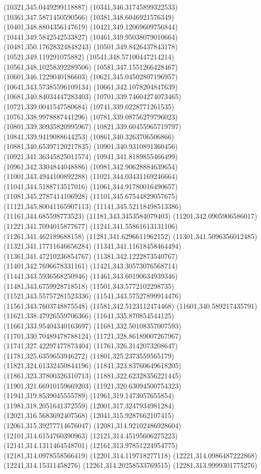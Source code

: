 {(10321,345.0449299118887)
(10341,346.31745899322533)
(10361,347.5871450590566)
(10381,348.6046921576349)
(10401,348.8804356147619)
(10421,349.12069609756844)
(10441,349.5842542533827)
(10461,349.95038079010664)
(10481,350.17628324848243)
(10501,349.8426437843178)
(10521,349.119291075882)
(10541,348.57100447214214)
(10561,348.10258392289506)
(10581,347.1551266428467)
(10601,346.1229040186603)
(10621,345.04502807196957)
(10641,343.57385596109134)
(10661,342.1078204847639)
(10681,340.84034447283403)
(10701,339.74604274073465)
(10721,339.0041547580684)
(10741,339.0228771261535)
(10761,338.9978887441296)
(10781,339.08756279796023)
(10801,339.30935820995967)
(10821,339.60455965719797)
(10841,339.9419088644253)
(10861,340.3263706506866)
(10881,340.65397120217835)
(10901,340.9310891360456)
(10921,341.36345825011574)
(10941,341.8189855466499)
(10961,342.3304844048886)
(10981,342.90628884639654)
(11001,343.4944100892288)
(11021,344.03431169246664)
(11041,344.5188713517016)
(11061,344.91780016490657)
(11081,345.2787414106928)
(11101,345.67544829057675)
(11121,345.80041165907113)
(11141,345.52118498513386)
(11161,344.685598773523)
(11181,343.3453584079403)
(11201,342.0905906586017)
(11221,341.7094015877677)
(11241,341.55861613131106)
(11261,341.462189688158)
(11281,341.6296611962152)
(11301,341.5096356012485)
(11321,341.17711646656284)
(11341,341.11618458464494)
(11361,341.47210236854767)
(11381,342.1222873540767)
(11401,342.7696678331161)
(11421,343.30573076568714)
(11441,343.5936568250946)
(11461,343.60190634939346)
(11481,343.6759928718518)
(11501,343.5772102298735)
(11521,343.55757281523336)
(11541,343.57527899914476)
(11561,343.7603748875548)
(11581,342.5123112474468)
(11601,340.589217435791)
(11621,338.47926559706366)
(11641,335.870854544125)
(11661,333.95404340163697)
(11681,332.50108357007593)
(11701,330.70489478788124)
(11721,328.86189007267967)
(11741,327.42297477873404)
(11761,326.3142073208647)
(11781,325.6359653946272)
(11801,325.2373559565179)
(11821,324.61332450844196)
(11841,323.83760649618205)
(11861,323.37800326310713)
(11881,322.62328356221445)
(11901,321.66910159669203)
(11921,320.63094500754323)
(11941,319.8539045555789)
(11961,319.1473057655854)
(11981,318.2051641372559)
(12001,317.3247934981284)
(12021,316.5683692407568)
(12041,315.9287662107415)
(12061,315.39277714676047)
(12081,314.92102486928604)
(12101,314.6154760390963)
(12121,314.45195606275223)
(12141,314.1311464548701)
(12161,313.97851224954775)
(12181,314.0978558566419)
(12201,314.119718277118)
(12221,314.0986487222868)
(12241,314.15311458276)
(12261,314.20258533769515)
(12281,313.9999301775276)
}

